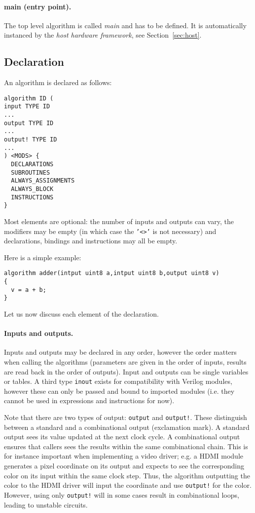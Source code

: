\documentclass[a4]{article}
\newcommand\verilog{Verilog}
\begin{document}
\paragraph{main (entry point).}
The top level algorithm is called \textit{main} and has to be defined. It is automatically instanced by the \textit{host hardware framework}, see Section~\ref{sec:host}.


\subsection{Declaration}

An algorithm is declared as follows:
\begin{verbatim}
algorithm ID (
input TYPE ID
...
output TYPE ID
...
output! TYPE ID
...
) <MODS> {
  DECLARATIONS
  SUBROUTINES
  ALWAYS_ASSIGNMENTS
  ALWAYS_BLOCK
  INSTRUCTIONS
}
\end{verbatim}

Most elements are optional: the number of inputs and outputs can vary, the modifiers may be empty (in which case the \texttt{'<>'} is not necessary) and declarations, bindings and instructions may all be empty.

Here is a simple example:
\begin{verbatim}
algorithm adder(intput uint8 a,intput uint8 b,output uint8 v)
{
  v = a + b;
}
\end{verbatim}

\noindent Let us now discuss each element of the declaration.


\paragraph{Inputs and outputs.}

Inputs and outputs may be declared in any order, however the order matters when calling the algorithms (parameters are given in the order of inputs, results are read back in the order of outputs). Input and outputs can be single variables or tables.
A third type \texttt{inout} exists for compatibility with \verilog{} modules, however these can only be passed and bound to imported modules (i.e. they cannot be used in expressions and instructions for now).

Note that there are two types of output: \texttt{output} and \texttt{output!}. These distinguish between a standard and a combinational output (exclamation mark). A standard output sees its value updated at the next clock cycle. A combinational output ensures that callers sees the results within the same combinational chain. This is for instance important when implementing a video driver; e.g. a HDMI module generates a pixel coordinate on its output and expects to see the corresponding color on its input within the same clock step. Thus, the algorithm outputting the color to the HDMI driver will input the coordinate and use \texttt{output!} for the color. However, using only \texttt{output!} will in some cases result in combinational loops, leading to unstable circuits.
\end{document}
